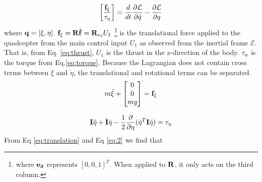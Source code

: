 \documentclass[11pt]{ucthesis}
\begin{document}
\begin{equation}
\left[ \frac{\bold{f}_{\xi}}{\bold{\tau}_{\eta}}\right] = \frac{d}{dt}\frac{\partial\mathcal{L}}{\partial\dot{q}} - \frac{\partial\mathcal{L}}{\partial q}
\end{equation}
where $\bold{q} = [\xi,\eta]$. $\bold{f}_{\xi} = \bold{R}\hat{\bold{f}} = \bold{R}_{e_3}U_1$ \footnote{where $\bold{e_3} $ represents $[0,0,1]^T$. When applied to $\bold{R}$, it only acts on the third column.} is the translational force applied to the quadcopter from the main control input $U_1$ as observed from the inertial frame $\mathscr{E}$. That is, from Eq. \ref{eq:thrust}, $U_1$ is the thrust in the z-direction of the body. $\bold{\tau}_{\eta}$ is the torque from Eq.\ref{eq:torque}. Because the Lagrangian does not contain cross terms between $\dot{\xi}$ and $\dot{\eta}$, the translational and rotational terms can be separated.
\begin{equation}\label{eq:translation}
m\ddot{\xi} + 
\begin{bmatrix}
0\\
0\\
mg
\end{bmatrix} = \bold{f}_{\xi}
\end{equation}

\begin{equation}\label{eq:rotation}
\bold{I}\ddot{\eta} + \dot{\bold{I}}\dot{\eta} - \frac{1}{2}\frac{\partial}{\partial\eta}(\dot{\eta}^T\bold{I}\dot{\eta}) = \tau_{\eta}
\end{equation}
From Eq \ref{eq:translation} and Eq \ref{eq:2} we find that
\end{document}
